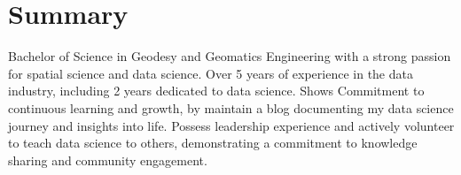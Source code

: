 \documentclass[a4paper, 11pt]{article}
\begin{document}
    
    \vspace{20pt}
    \section{Summary}
    {Bachelor of Science in Geodesy and Geomatics Engineering with a strong passion for 
    spatial science and data science. Over 5 years of experience in the data industry, 
    including 2 years dedicated to data science. Shows Commitment to continuous learning and 
    growth, by maintain a blog documenting my data science journey and insights into 
    life. Possess leadership experience and actively volunteer to teach data science to 
    others, demonstrating a commitment to knowledge sharing and community engagement.}
    \vspace{-5pt}
\end{document}
